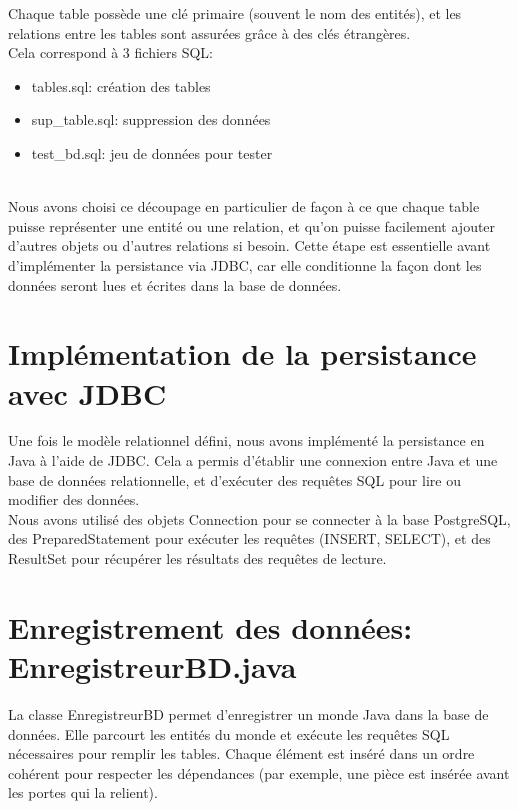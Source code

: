 Chaque table possède une clé primaire (souvent le nom des entités), et les relations entre les tables sont assurées grâce à des clés étrangères.\\

Cela correspond à 3 fichiers SQL:
\begin{itemize}
	\item tables.sql: création des tables
	\item sup_table.sql: suppression des données
	\item test_bd.sql: jeu de données pour tester
\end{itemize}\\

Nous avons choisi ce découpage en particulier de façon à ce que chaque table puisse représenter une entité ou une relation, et qu'on puisse facilement ajouter d'autres objets ou d'autres relations si besoin. Cette étape est essentielle avant d’implémenter la persistance via JDBC, car elle conditionne la façon dont les données seront lues et écrites dans la base de données.\\

\section{Implémentation de la persistance avec JDBC}

Une fois le modèle relationnel défini, nous avons implémenté la persistance en Java à l’aide de JDBC. Cela a permis d’établir une connexion entre Java et une base de données relationnelle, et d’exécuter des requêtes SQL pour lire ou modifier des données.\\

Nous avons utilisé des objets Connection pour se connecter à la base PostgreSQL, des PreparedStatement pour exécuter les requêtes (INSERT, SELECT), et des ResultSet pour récupérer les résultats des requêtes de lecture.\\

\section{Enregistrement des données: EnregistreurBD.java}

La classe EnregistreurBD permet d’enregistrer un monde Java dans la base de données.  
Elle parcourt les entités du monde et exécute les requêtes SQL nécessaires pour remplir les tables. Chaque élément est inséré dans un ordre cohérent pour respecter les dépendances (par exemple, une pièce est insérée avant les portes qui la relient).\\

